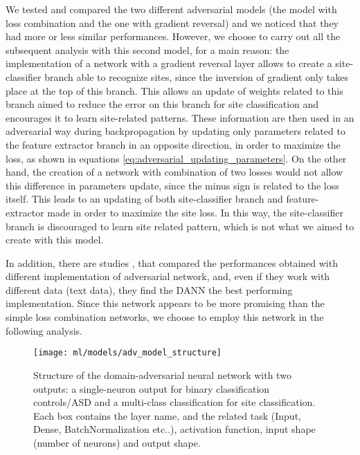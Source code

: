 \documentclass[11pt]{report}
\begin{document}
\hfill

We tested and compared the two different adversarial models (the model with loss combination and the one with gradient reversal) and we noticed that they had more or less similar performances. However, we choose to carry out all the subsequent analysis with this second model, for a main reason:
the implementation of a network with a gradient reversal layer allows to create a site-classifier branch able to recognize sites, since the inversion of gradient only takes place at the top of this branch. This allows an update of weights related to this branch aimed to reduce the error on this branch for site classification and encourages it to learn site-related patterns. These information are then used in an adversarial way during backpropagation by updating only parameters related to the feature extractor branch in an opposite direction, in order to maximize the loss, as shown in equations \ref{eq:adversarial_updating_parameters}.
On the other hand, the creation of a network with combination of two losses would not allow this difference in parameters update, since the minus sign is related to the loss itself.
This leads to an updating of both site-classifier branch and feature-extractor made in order to maximize the site loss.
In this way, the site-classifier branch is discouraged to learn site related pattern, which is not what we aimed to create with this model.

In addition, there are studies \cite{kamath2019}, that compared the performances obtained with different implementation of adversarial network, and, even if they work with different data (text data), they find the DANN the best performing implementation.
Since this network appears to be more promising than the simple loss combination networks, we choose to employ this network in the following analysis.




\begin{figure}[h!]
\centering
\texttt{[image: ml/models/adv\_model\_structure]}
\caption{Structure of the domain-adversarial neural network with two outputs: a single-neuron output for binary classification controls/ASD and a multi-class classification for site classification.
Each box contains the layer name, and the related task (Input, Dense, BatchNormalization etc..), activation function, input shape (number of neurons) and output shape.
}
\label{fig:adv_model_structure}
\end{figure}
\end{document}
